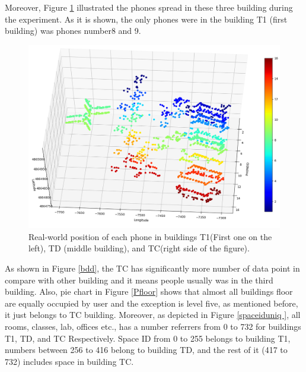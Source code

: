 Moreover, Figure \ref{phoneall} illustrated the phones spread in these three building during the experiment. As it is shown, the only phones were in the building T1 (first building) was phones number8 and 9. 


\begin{figure}
    \centering
    \includegraphics[width = 10 cm]{image/Chapters/Chapter6/LatLongUser.png}
    \caption{Real-world position of each phone in buildings T1(First one on the left), TD (middle building), and TC(right side of the figure).}
    \label{phoneall}
\end{figure}





As shown in Figure \ref{bdd}, the TC has significantly more number of data point in compare with other building  and it means people usually was in the third building. Also, pie chart in Figure \ref{Pfloor} shows that almost all buildings floor are equally occupied by user and the exception is level five, as mentioned before, it just belongs to TC building. Moreover, as depicted in Figure \ref{spaceiduniq }, all rooms, classes, lab, offices etc., has a number referrers from 0 to 732 for  buildings T1, TD, and TC Respectively. Space ID from 0 to 255 belongs to building T1, numbers between 256 to 416 belong to building TD, and the rest of it (417 to 732) includes space in building TC.



